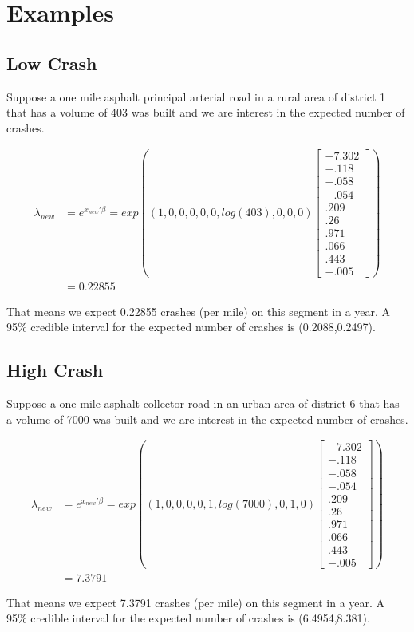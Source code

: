 \documentclass[a4paper]{article}\usepackage[]{graphicx}\usepackage[]{color}
\begin{document}
\section{Examples}
\subsection{Low Crash}


  
Suppose a one mile asphalt principal arterial road in a rural area of district 1 that has a volume of 403 was built and we are interest in the expected number of crashes.

\begin{align*}
\lambda_{new} &= e^{x_{new}'\beta} = exp((1,0,0,0,0,0,log(403),0,0,0) \begin{bmatrix} -7.302\\-.118\\-.058\\-.054\\.209\\.26\\.971\\.066\\.443\\-.005 \end{bmatrix}) \\
            &= 0.22855
\end{align*}

That means we expect 0.22855 crashes (per mile) on this segment in a year. A 95\% credible interval for the expected number of crashes is (0.2088,0.2497).


\subsection{High Crash}


Suppose a one mile asphalt collector road in an urban area of district 6 that has a volume of 7000 was built and we are interest in the expected number of crashes.

\begin{align*}
\lambda_{new} &= e^{x_{new}'\beta} = exp((1,0,0,0,0,1,log(7000),0,1,0) \begin{bmatrix} -7.302\\-.118\\-.058\\-.054\\.209\\.26\\.971\\.066\\.443\\-.005 \end{bmatrix}) \\
            &= 7.3791
\end{align*}

That means we expect 7.3791 crashes (per mile) on this segment in a year. A 95\% credible interval for the expected number of crashes is (6.4954,8.381).

% 
\end{document}
